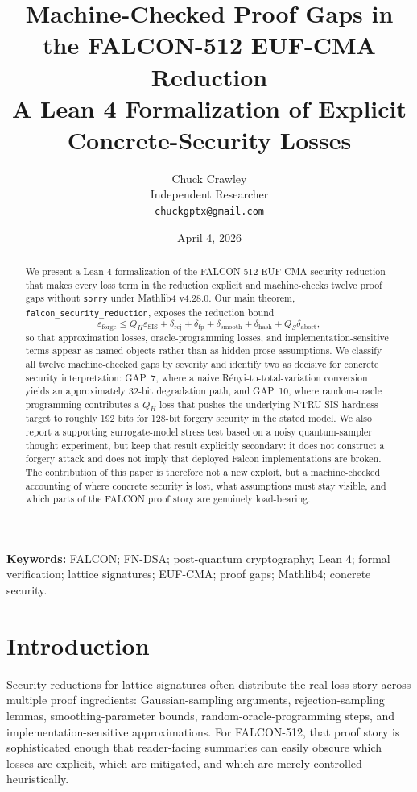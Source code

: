 \documentclass[11pt]{article}
\title{Machine-Checked Proof Gaps in the FALCON-512 EUF-CMA Reduction\\\large A Lean 4 Formalization of Explicit Concrete-Security Losses}
\author{Chuck Crawley\\Independent Researcher\\\texttt{chuckgptx@gmail.com}}
\date{April 4, 2026}
\begin{document}
\maketitle

\begin{abstract}
We present a Lean 4 formalization of the FALCON-512 EUF-CMA security reduction that makes every loss term in the reduction explicit and machine-checks twelve proof gaps without \texttt{sorry} under Mathlib4 v4.28.0. Our main theorem, \texttt{falcon\_security\_reduction}, exposes the reduction bound
\[
\varepsilon_{\mathrm{forge}} \le Q_H \varepsilon_{\mathrm{SIS}} + \delta_{\mathrm{rej}} + \delta_{\mathrm{fp}} + \delta_{\mathrm{smooth}} + \delta_{\mathrm{hash}} + Q_S \delta_{\mathrm{abort}},
\]
so that approximation losses, oracle-programming losses, and implementation-sensitive terms appear as named objects rather than as hidden prose assumptions. We classify all twelve machine-checked gaps by severity and identify two as decisive for concrete security interpretation: GAP~7, where a naive R\'{e}nyi-to-total-variation conversion yields an approximately 32-bit degradation path, and GAP~10, where random-oracle programming contributes a $Q_H$ loss that pushes the underlying NTRU-SIS hardness target to roughly 192 bits for 128-bit forgery security in the stated model. We also report a supporting surrogate-model stress test based on a noisy quantum-sampler thought experiment, but keep that result explicitly secondary: it does not construct a forgery attack and does not imply that deployed Falcon implementations are broken. The contribution of this paper is therefore not a new exploit, but a machine-checked accounting of where concrete security is lost, what assumptions must stay visible, and which parts of the FALCON proof story are genuinely load-bearing.
\end{abstract}

\noindent\textbf{Keywords:} FALCON; FN-DSA; post-quantum cryptography; Lean 4; formal verification; lattice signatures; EUF-CMA; proof gaps; Mathlib4; concrete security.

\section{Introduction}

Security reductions for lattice signatures often distribute the real loss story across multiple proof ingredients: Gaussian-sampling arguments, rejection-sampling lemmas, smoothing-parameter bounds, random-oracle-programming steps, and implementation-sensitive approximations. For FALCON-512, that proof story is sophisticated enough that reader-facing summaries can easily obscure which losses are explicit, which are mitigated, and which are merely controlled heuristically.
\end{document}

